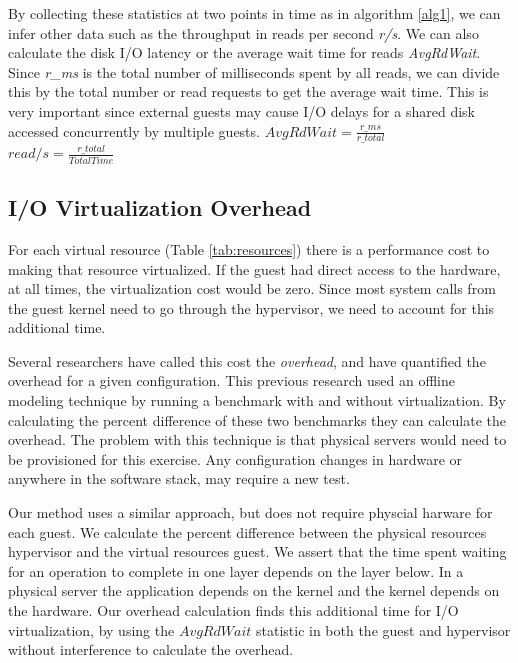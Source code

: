 By collecting these statistics at two points in time as in algorithm \ref{alg1}, we can infer other data such as the throughput in reads per second \emph{r/s}.  We can also calculate the disk I/O latency or the average wait time for reads \emph{AvgRdWait}.  
Since \emph{r\_ms} is the total number of milliseconds spent by all reads, we can divide this by the total number or read requests to get the average wait time.  This is very important since external guests may cause I/O delays for a shared disk accessed concurrently by multiple guests.
\newline\newline
\Large
	$AvgRdWait = \frac{r\_ms}{r\_total}$ \\
	$read/s = \frac{r\_total}{TotalTime}$ \\
\normalsize

\subsection{I/O Virtualization Overhead}
For each virtual resource (Table \ref{tab:resources}) there is a performance cost to making that resource virtualized.  If the guest had direct access to the hardware, at all times, the virtualization cost would be zero.  Since most system calls from the guest kernel need to go through the hypervisor, we need to account for this additional time.

Several researchers \cite{cherkasova, huber1} have called this cost the \emph{overhead}, and have quantified the overhead for a given configuration.  This previous research used an offline modeling technique by running a benchmark with and without virtualization.  By calculating the percent difference of these two benchmarks they can calculate the overhead.
The problem with this technique is that physical servers would need to be provisioned for this exercise.  Any configuration changes in hardware or anywhere in the software stack, may require a new test.  

Our method uses a similar approach, but does not require physcial harware for each guest.  We calculate the percent difference between the physical resources hypervisor and the virtual resources guest. 
We assert that the time spent waiting for an operation to complete in one layer depends on the layer below.  
In a physical server the application depends on the kernel and the kernel depends on the hardware.  
Our overhead calculation finds this additional time for I/O virtualization, by using the $AvgRdWait$ statistic in both the guest and hypervisor without interference to calculate the overhead.

